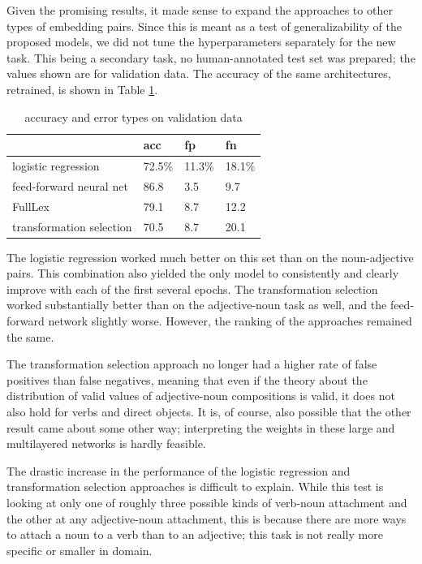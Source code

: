 \documentclass[a4paper, 12pt]{article}
\begin{document}
Given the promising results, it made sense to expand the approaches to other types of embedding pairs. Since this is meant as a test of generalizability of the proposed models, we did not tune the hyperparameters separately for the new task. This being a secondary task, no human-annotated test set was prepared; the values shown are for validation data. The accuracy of the same architectures, retrained, is shown in Table \ref{accuracy-vn}.

\begin{table}[]
	\centering
	\begin{tabular}{l|lll}
		                         & acc      & fp       & fn        \\ \hline
		logistic regression      & 72.5\%   & 11.3\%   & 18.1\%    \\
		feed-forward neural net  & 86.8     & 3.5      & 9.7       \\
		FullLex                  & 79.1     & 8.7      & 12.2      \\
		transformation selection & 70.5     & 8.7      & 20.1
	\end{tabular}
	\caption{accuracy and error types on validation data}
	\label{accuracy-vn}
\end{table}

The logistic regression worked much better on this set than on the noun-adjective pairs. This combination also yielded the only model to consistently and clearly improve with each of the first several epochs. The transformation selection worked substantially better than on the adjective-noun task as well, and the feed-forward network slightly worse. However, the ranking of the approaches remained the same.

The transformation selection approach no longer had a higher rate of false positives than false negatives, meaning that even if the theory about the distribution of valid values of adjective-noun compositions is valid, it does not also hold for verbs and direct objects. It is, of course, also possible that the other result came about some other way; interpreting the weights in these large and multilayered networks is hardly feasible.

The drastic increase in the performance of the logistic regression and transformation selection approaches is difficult to explain. While this test is looking at only one of roughly three possible kinds of verb-noun attachment and the other at any adjective-noun attachment, this is because there are more ways to attach a noun to a verb than to an adjective; this task is not really more specific or smaller in domain.
\end{document}
